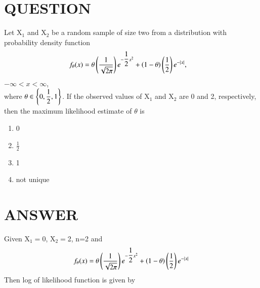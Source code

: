 \documentclass[journal,12pt,twocolumn]{IEEEtran}
\begin{document}
\section*{QUESTION}
Let X$_{1}$ and X$_{2}$ be a random sample of size two
from a distribution with probability density
function
\begin{align}
    f_{\theta}(x) &= \theta \left(\dfrac{1}{\sqrt{2\pi}}\right)e^{-\dfrac{1}{2} x^{2}} + \left(1-\theta\right)\left(\dfrac{1}{2}\right)e^{-\mid x\mid} \nonumber,
\end{align}
$-\infty<x<\infty$,\\
where  $\theta \in \left\{ 0,\dfrac{1}{2}, 1 \right\}$. If the observed values
of X$_{1}$ and X$_{2}$ are 0 and 2, respectively, then
the maximum likelihood estimate of $\theta$ is
\begin{enumerate}
    \item 0 
    \item $\frac{1}{2}$
    \item 1
    \item not unique
\end{enumerate}
\section*{ANSWER}
Given X$_{1}=$0, X$_{2}=$2, n=2 and
\begin{align}
    f_{\theta}(x) =\theta \left(\dfrac{1}{\sqrt{2\pi}}\right)e^{-\dfrac{1}{2} x^{2}} + \left(1-\theta\right)\left(\dfrac{1}{2}\right)e^{-\mid x\mid}
\end{align}
Then log of likelihood function is given by
\end{document}
